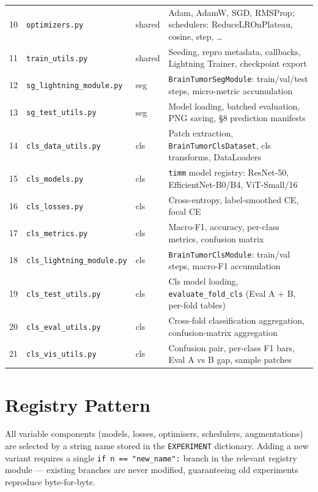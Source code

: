 \documentclass[12pt,a4paper]{article}
\begin{document}
\begin{longtable}{C{0.5cm} L{4.5cm} C{1.5cm} L{7.5cm}}
  10 & \texttt{optimizers.py}           & shared & Adam, AdamW, SGD, RMSProp; schedulers: ReduceLROnPlateau, cosine, step, \ldots \\
  11 & \texttt{train\_utils.py}         & shared & Seeding, repro metadata, callbacks, Lightning Trainer, checkpoint export \\
  12 & \texttt{sg\_lightning\_module.py}& seg    & \texttt{BrainTumorSegModule}: train/val/test steps, micro-metric accumulation \\
  13 & \texttt{sg\_test\_utils.py}      & seg    & Model loading, batched evaluation, PNG saving, §8 prediction manifests \\
  14 & \texttt{cls\_data\_utils.py}     & cls    & Patch extraction, \texttt{BrainTumorClsDataset}, cls transforms, DataLoaders \\
  15 & \texttt{cls\_models.py}          & cls    & \texttt{timm} model registry: ResNet-50, EfficientNet-B0/B4, ViT-Small/16 \\
  16 & \texttt{cls\_losses.py}          & cls    & Cross-entropy, label-smoothed CE, focal CE \\
  17 & \texttt{cls\_metrics.py}         & cls    & Macro-F1, accuracy, per-class metrics, confusion matrix \\
  18 & \texttt{cls\_lightning\_module.py}& cls   & \texttt{BrainTumorClsModule}: train/val steps, macro-F1 accumulation \\
  19 & \texttt{cls\_test\_utils.py}     & cls    & Cls model loading, \texttt{evaluate\_fold\_cls} (Eval A + B, per-fold tables) \\
  20 & \texttt{cls\_eval\_utils.py}     & cls    & Cross-fold classification aggregation, confusion-matrix aggregation \\
  21 & \texttt{cls\_vis\_utils.py}      & cls    & Confusion pair, per-class F1 bars, Eval A vs B gap, sample patches \\
\end{longtable}

\section{Registry Pattern}

All variable components (models, losses, optimisers, schedulers, augmentations)
are selected by a string name stored in the \texttt{EXPERIMENT} dictionary.
Adding a new variant requires a single \texttt{if n == "new\_name":} branch in
the relevant registry module --- existing branches are never modified, guaranteeing
old experiments reproduce byte-for-byte.
\end{document}

